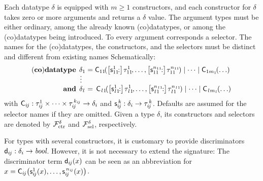 Each datatype $\delta$ is equipped with
$m \ge 1$ constructors, and each constructor for $\delta$ takes zero or more
arguments and returns a $\delta$ value. The argument types must be either
ordinary, among the already known (co)datatypes, or among the (co)datatypes
being introduced.
%
To every argument corresponds a selector. The names for the (co)data\-types, the
constructors, and the selectors must be distinct and different from
existing names%
Schematically:
%
\[
\begin{aligned}[t]
\!(\keyw{co})\keyw{datatype}\;\,
  \delta_1 & {}= \smash{\const{C}_{11\!}(\bigl[\const{s}_{11\!}^1{:}\bigr]\vthinspace \tau_{11\!}^1, \ldots, \bigl[\const{s}_{11\!}^{n_{11\!}}{:}\bigr]\vthinspace \tau_{11\!}^{n_{11\!}})} \mid \cdots \mid \smash{\const{C}_{1m_1\!}(\ldots)} \\
   \smash{\vdots\,\,\,} \\[-1\jot]
  \keyw{and}\; \,\delta_{\elllx} & =\, \smash{\const{C}_{\elll 1\!}(\bigl[\const{s}_{\elll 1\!}^1{:}\bigr]\vthinspace \tau_{\elll 1\!}^1, \ldots, \bigl[\const{s}_{\elll 1\!}^{n_{\elll 1\!}}{:}\bigr]\vthinspace \tau_{\elll 1\!}^{n_{\elll 1\!}})} \mid \cdots \mid \smash{\const{C}_{\elll m_{\elllx}\!}(\ldots)}
\end{aligned}
\]
%
with
$\textsf{C}_{i\kern-0.083333em j} : \tau_{i\kern-0.083333em j}^1\times\cdots\times\tau_{i\kern-0.083333em j}^{\,k_{\smash{i\kern-0.083333em j}}} \to \delta_i$
and $\textsf{s}_{i\kern-0.083333em j}^{\,k} : \delta_i \to \tau_{i\kern-0.083333em j}^{\,k}$. Defaults are assumed for
the selector names if they are omitted. Given a type $\delta$, its
constructors and selectors are denoted by $\mathcal{F}_{\mathrm{ctr}}^\delta$ and $\mathcal{F}_{\mathrm{sel}}^\delta$,
respectively.

For types with several constructors, it is customary to provide discriminators
$\textsf{d}_{i\kern-0.083333em j} : \delta_i \to \textit{bool}$. However,
it is not necessary to extend the signature:
The discriminator term $\textsf{d}_{i\kern-0.083333em j}(x)$ can be seen as an abbreviation for
$x = \textsf{C}_{i\kern-0.083333em j}\bigl(\textsf{s}_{i\kern-0.083333em j}^1(x), \ldots, \textsf{s}_{i\kern-0.083333em j}^{\,n_{\smash{{i\kern-0.083333em j}}}}(x)\bigr)$.

